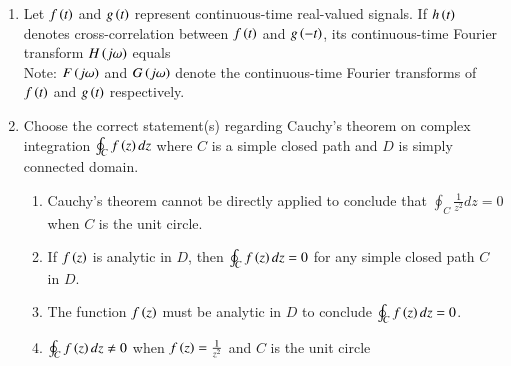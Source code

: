 \documentclass[journal,12pt,onecolumn]{IEEEtran}
\theoremstyle{remark}
\begin{document}
\begin{enumerate}
\item Let $f\left(t\right)$ and $g\left(t\right)$ represent continuous-time real-valued signals. If $h\left(t\right)$ denotes cross-correlation between $f\left(t\right)$ and $g\left(-t\right)$, its continuous-time Fourier transform $H\left(j\omega\right)$ equals  \\
Note: $F\left(j\omega\right)$ and $G\left(j\omega\right)$ denote the continuous-time Fourier transforms of $f\left(t\right)$ and $g\left(t\right)$ respectively. \par\hfill{}
\begin{enumerate}
\end{enumerate}


\item Choose the correct statement(s) regarding Cauchy's theorem on complex integration $\oint_C f\left(z\right)dz$ where $C$ is a simple closed path and $D$ is simply connected domain.  \par\hfill{}
\begin{enumerate}
\item Cauchy's theorem cannot be directly applied to conclude that $\oint_C \tfrac{1}{z^2}dz=0$ when $C$ is the unit circle.
\item If $f\left(z\right)$ is analytic in $D$, then $\oint_C f\left(z\right)dz=0$ for any simple closed path $C$ in $D$.
\item The function $f\left(z\right)$ must be analytic in $D$ to conclude $\oint_C f\left(z\right)dz=0$.
\item $\oint_C f\left(z\right)dz \ne 0$ when $f\left(z\right) = \tfrac{1}{z^2}$ and $C$ is the unit circle
\end{enumerate}



\end{enumerate}
\end{document}
